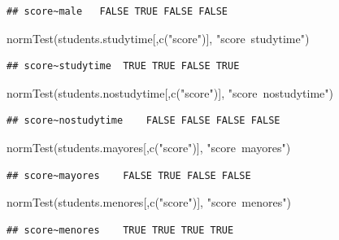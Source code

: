 \documentclass[]{article}
\newenvironment{Shaded}{\begin{snugshade}}{\end{snugshade}}
\newcommand{\KeywordTok}[1]{\textcolor[rgb]{0.94,0.87,0.69}{#1}}
\newcommand{\NormalTok}[1]{\textcolor[rgb]{0.80,0.80,0.80}{#1}}
\newcommand{\StringTok}[1]{\textcolor[rgb]{0.80,0.58,0.58}{#1}}
\begin{document}
\begin{verbatim}
## score~male   FALSE TRUE FALSE FALSE  
\end{verbatim}

\begin{Shaded}
\begin{Highlighting}[]
\KeywordTok{normTest}\NormalTok{(students.studytime[,}\KeywordTok{c}\NormalTok{(}\StringTok{"score"}\NormalTok{)], }\StringTok{"score~studytime"}\NormalTok{)}
\end{Highlighting}
\end{Shaded}

\begin{verbatim}
## score~studytime  TRUE TRUE FALSE TRUE    
\end{verbatim}

\begin{Shaded}
\begin{Highlighting}[]
\KeywordTok{normTest}\NormalTok{(students.nostudytime[,}\KeywordTok{c}\NormalTok{(}\StringTok{"score"}\NormalTok{)], }\StringTok{"score~nostudytime"}\NormalTok{)}
\end{Highlighting}
\end{Shaded}

\begin{verbatim}
## score~nostudytime    FALSE FALSE FALSE FALSE     
\end{verbatim}

\begin{Shaded}
\begin{Highlighting}[]
\KeywordTok{normTest}\NormalTok{(students.mayores[,}\KeywordTok{c}\NormalTok{(}\StringTok{"score"}\NormalTok{)], }\StringTok{"score~mayores"}\NormalTok{)}
\end{Highlighting}
\end{Shaded}

\begin{verbatim}
## score~mayores    FALSE TRUE FALSE FALSE  
\end{verbatim}

\begin{Shaded}
\begin{Highlighting}[]
\KeywordTok{normTest}\NormalTok{(students.menores[,}\KeywordTok{c}\NormalTok{(}\StringTok{"score"}\NormalTok{)], }\StringTok{"score~menores"}\NormalTok{)}
\end{Highlighting}
\end{Shaded}

\begin{verbatim}
## score~menores    TRUE TRUE TRUE TRUE     
\end{verbatim}
\end{document}
